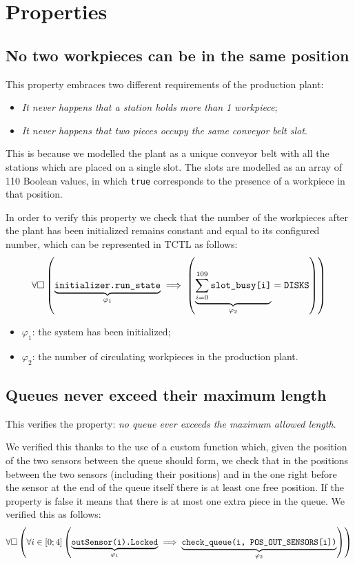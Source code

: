 \documentclass[a4paper]{article}
\newcommand{\formulacomment}[2]{\underset{\varphi_{#1}}{\underbrace{#2}}}
\newcommand{\formulatext}[1]{\text{\texttt{#1}}}
\begin{document}
    \section{Properties}

    \subsection{No two workpieces can be in the same position} \label{property:1-2}

    This property embraces two different requirements of the production plant:
    \begin{itemize}
        \item \textit{It never happens that a station holds more than 1 workpiece};
        \item \textit{It never happens that two pieces occupy the same conveyor belt slot}.
    \end{itemize}

    This is because we modelled the plant as a unique conveyor belt with all the stations which are placed on a single slot. The slots are modelled as an array of 110 Boolean values, in which \texttt{true} corresponds to the presence of a workpiece in that position.\medskip

    In order to verify this property we check that the number of the workpieces after the plant has been initialized remains constant and equal to its configured number, which can be represented in TCTL as follows:
    \[\forall \square \left(\formulacomment{1}{\formulatext{initializer.run\_state}} \implies \left(\formulacomment{2}{\sum_{i = 0}^{109} \formulatext{slot\_busy[i]}} = \formulatext{DISKS}\right)\right)\]

    \begin{itemize}
        \item \(\varphi_1\): the system has been initialized;
        \item \(\varphi_2\): the number of circulating workpieces in the production plant.
    \end{itemize}

    \subsection{Queues never exceed their maximum length} \label{property:3}

    This verifies the property: \textit{no queue ever exceeds the maximum allowed length}.\medskip

    We verified this thanks to the use of a custom function which, given the position of the two sensors between the queue should form, we check that in the positions between the two sensors (including their positions) and in the one right before the sensor at the end of the queue itself there is at least one free position. If the property is false it means that there is at most one extra piece in the queue. We verified this as follows:
    \[\forall \square \left(\forall i \in \left[0; 4\right] \left(\formulacomment{1}{\formulatext{outSensor(i).Locked}} \implies \formulacomment{2}{\formulatext{check\_queue(i, POS\_OUT\_SENSORS[i])}}\right)\right)\]
\end{document}
